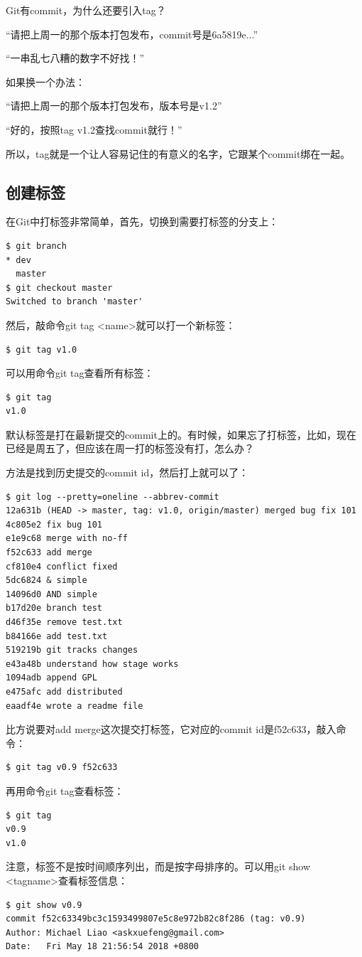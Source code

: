 \documentclass[•]{article}
\begin{document}
\begin{CJK}{UTF8}{gbsn}
Git有commit，为什么还要引入tag？

“请把上周一的那个版本打包发布，commit号是6a5819e...”

“一串乱七八糟的数字不好找！”

如果换一个办法：

“请把上周一的那个版本打包发布，版本号是v1.2”

“好的，按照tag v1.2查找commit就行！”

所以，tag就是一个让人容易记住的有意义的名字，它跟某个commit绑在一起。

\subsection{创建标签}

在Git中打标签非常简单，首先，切换到需要打标签的分支上：

\begin{lstlisting}
$ git branch
* dev
  master
$ git checkout master
Switched to branch 'master'
\end{lstlisting}

然后，敲命令git tag <name>就可以打一个新标签：

\begin{lstlisting}
$ git tag v1.0
\end{lstlisting}

可以用命令git tag查看所有标签：

\begin{lstlisting}
$ git tag
v1.0
\end{lstlisting}

默认标签是打在最新提交的commit上的。有时候，如果忘了打标签，比如，现在已经是周五了，但应该在周一打的标签没有打，怎么办？

方法是找到历史提交的commit id，然后打上就可以了：
\begin{lstlisting}
$ git log --pretty=oneline --abbrev-commit
12a631b (HEAD -> master, tag: v1.0, origin/master) merged bug fix 101
4c805e2 fix bug 101
e1e9c68 merge with no-ff
f52c633 add merge
cf810e4 conflict fixed
5dc6824 & simple
14096d0 AND simple
b17d20e branch test
d46f35e remove test.txt
b84166e add test.txt
519219b git tracks changes
e43a48b understand how stage works
1094adb append GPL
e475afc add distributed
eaadf4e wrote a readme file
\end{lstlisting}
比方说要对add merge这次提交打标签，它对应的commit id是f52c633，敲入命令：
\begin{lstlisting}
$ git tag v0.9 f52c633
\end{lstlisting}
再用命令git tag查看标签：
\begin{lstlisting}
$ git tag
v0.9
v1.0
\end{lstlisting}
注意，标签不是按时间顺序列出，而是按字母排序的。可以用git show <tagname>查看标签信息：
\begin{lstlisting}
$ git show v0.9
commit f52c63349bc3c1593499807e5c8e972b82c8f286 (tag: v0.9)
Author: Michael Liao <askxuefeng@gmail.com>
Date:   Fri May 18 21:56:54 2018 +0800


\end{lstlisting}
\end{CJK}
\end{document}
